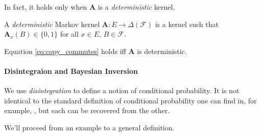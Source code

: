 In fact, it holds only when $\mathbf{A}$ is a \emph{deterministic} kernel.

\begin{definition}
A \emph{deterministic} Markov kernel $\mathbf{A}:E\to \Delta(\mathcal{F})$ is a kernel such that $\mathbf{A}_x(B)\in\{0,1\}$ for all $x\in E$, $B\in\mathcal{F}$.
\end{definition}

\begin{theorem}
Equation \ref{eq:copy_commutes} holds iff $\mathbf{A}$ is deterministic.
\end{theorem}

\paragraph{Disintegraion and Bayesian Inversion}\label{pgph:disint}

We use \emph{disintegration} to define a notion of conditional probability. It is not identical to the standard definition of conditional probability one can find in, for example, \citet{cinlar_probability_2011}, but each can be recovered from the other.

We'll proceed from an example to a general definition. 

